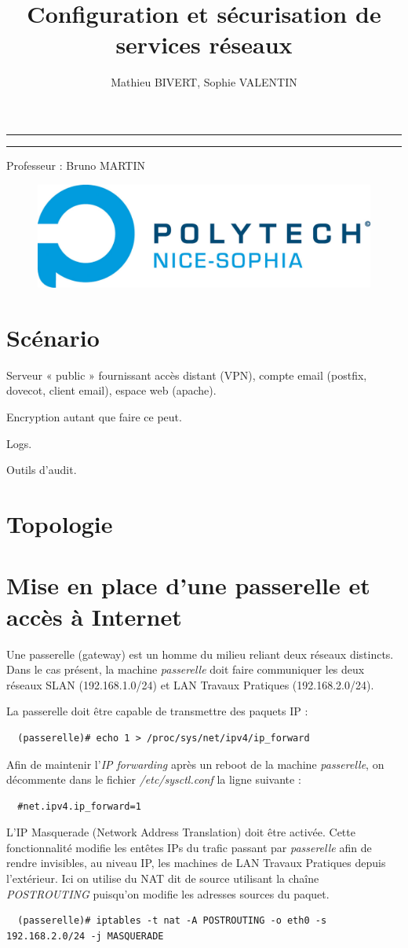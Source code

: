\documentclass[a4paper]{article}
\title{Configuration et sécurisation de services réseaux}
\author{Mathieu BIVERT, Sophie VALENTIN}
\makeatletter
\def\maketitle{
	\null
	\thispagestyle{empty}
	\vskip 1cm
	\begin{center}
		\normalfont\large\huge\@author
	\end{center}
	\vfil
	\vfil
	\vfil
	\vfil
	\vfil
	\vfil
	\vfil
	\vfil
	\vfil
	\vfil
	\vfil
	\hrule height 2pt
	\par
	\begin{center}
				\huge \strut \@title \par
				\@date
	\end{center}
	\hrule height 2pt
	\par
	\vfil
	\vfil
	\vfil
	\vfil
	\vfil
	\vfil
	\vfil
	\vfil
	\vfil
	\vfil
	\vfil
	\vfil
	\vfil
	\vfil
	\vfil
	\vfil
	\vfil
	\vfil
	\vfil
	\vfil
	\vfil
	\vfil
	\vfil
	\vfil
	\vfil
	\begin{center}
  			\huge Professeur : Bruno MARTIN
    \end{center}
	\null
	\begin{figure}[!ht]
		\centering
		\includegraphics[scale=.5]{polytech.png}
	\end{figure}
	\vfil
	\cleardoublepage
}
\makeatother
\begin{document}
\maketitle

\newpage
\tableofcontents

\newpage

\section{Scénario}
Serveur « public » fournissant accès distant (VPN), compte email
(postfix, dovecot, client email), espace web (apache).

Encryption autant que faire ce peut.

Logs.

Outils d'audit.

\section{Topologie}
\section{Mise en place d'une passerelle et accès à Internet}
Une passerelle (gateway) est un homme du milieu reliant
deux réseaux distincts. Dans le cas présent, la machine \textit{passerelle}
doit faire communiquer les deux réseaux SLAN (192.168.1.0/24) et LAN Travaux 
Pratiques (192.168.2.0/24).

La passerelle doit être capable de transmettre des paquets IP :
\begin{verbatim}
  (passerelle)# echo 1 > /proc/sys/net/ipv4/ip_forward
\end{verbatim}

Afin de maintenir l'\textit{IP forwarding} après un reboot de la machine
\textit{passerelle}, on décommente dans le fichier \textit{/etc/sysctl.conf}
la ligne suivante :
\begin{verbatim}
  #net.ipv4.ip_forward=1
\end{verbatim}

\vspace{1\baselineskip}
L'IP Masquerade (Network Address Translation) doit être
activée. Cette fonctionnalité modifie les entêtes IPs du trafic
passant par \textit{passerelle} afin de rendre invisibles, au niveau IP,
les machines de LAN Travaux Pratiques depuis l'extérieur.
Ici on utilise du NAT dit de source utilisant la chaîne 
\textit{POSTROUTING} puisqu'on modifie les adresses sources du paquet.
\begin{verbatim}
  (passerelle)# iptables -t nat -A POSTROUTING -o eth0 -s 192.168.2.0/24 -j MASQUERADE
\end{verbatim}
\end{document}
